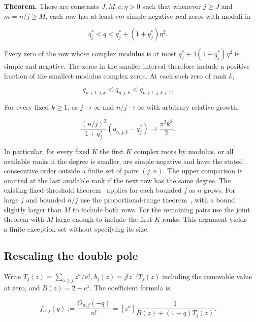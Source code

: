 \documentclass[11pt]{article}
\begin{document}
\textbf{Theorem.} There are constants \(J,M,c,\eta>0\) such that whenever \(j\ge J\) and \(m=n/j\ge M\), each row has at least \(cm\) simple negative real zeros with moduli in

\begin{equation*}
q_j^{\ast}<q<q_j^{\ast}+(1+q_j^{\ast})\eta^2.
\end{equation*}

Every zero of the row whose complex modulus is at most \(q_j^*+4(1+q_j^*)\eta^2\) is simple and negative. The zeros in the smaller interval therefore include a positive fraction of the smallest-modulus complex zeros. At each such zero of rank \(k\),

\begin{equation*}
q_{n+1,j,k}<q_{n,j,k}<q_{n+1,j,k+1}.
\end{equation*}

For every fixed \(k\ge1\), as \(j\to\infty\) and \(n/j\to\infty\) with arbitrary relative growth,

\begin{equation*}
\frac{(n/j)^2}{1+q_j^{\ast}}(q_{n,j,k}-q_j^{\ast})\longrightarrow\frac{\pi^2 k^2}{2}.
\end{equation*}

In particular, for every fixed \(K\) the first \(K\) complex roots by modulus, or all available ranks if the degree is smaller, are simple negative and have the stated consecutive order outside a finite set of pairs \((j,n)\). The upper comparison is omitted at the last available rank if the next row has the same degree. The existing fixed-threshold theorem~\cite{fixed} applies for each bounded \(j\) as \(n\) grows. For large \(j\) and bounded \(n/j\) use the proportional-range theorem~\cite{window}, with a bound slightly larger than \(M\) to include both rows. For the remaining pairs use the joint theorem with \(M\) large enough to include the first \(K\) ranks. This argument yields a finite exception set without specifying its size.

\subsection{Rescaling the double pole}
\label{sec:rescaling-the-double-pole}

Write \(T_j(z)=\sum_{a\ge j}z^a/a!\), \(b_j(z)=j!z^{-j}T_j(z)\) including the removable value at zero, and \(B(z)=2-e^z\). The coefficient formula is

\begin{equation*}
f_{n,j}(q):=\frac{O_{n,j}(-q)}{n!}=[z^n]\frac{1}{B(z)+(1+q)T_j(z)}.
\end{equation*}
\end{document}
